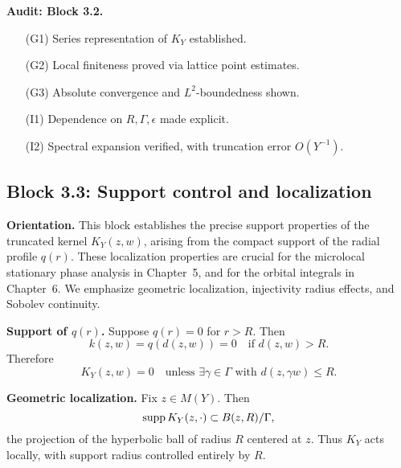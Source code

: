 \medskip

\noindent\textbf{Audit: Block 3.2.}
\begin{itemize}
  \item[(G1)] Series representation of $K_{Y}$ established. 
  \item[(G2)] Local finiteness proved via lattice point estimates. 
  \item[(G3)] Absolute convergence and $L^{2}$-boundedness shown. 
  \item[(I1)] Dependence on $R,\Gamma,\epsilon$ made explicit. 
  \item[(I2)] Spectral expansion verified, with truncation error $O(Y^{-1})$. 
\end{itemize}



\subsection{Block 3.3: Support control and localization}\label{block:3.3}

\noindent
\textbf{Orientation.}
This block establishes the precise support properties of the truncated kernel $K_{Y}(z,w)$,
arising from the compact support of the radial profile $q(r)$.
These localization properties are crucial for the microlocal stationary phase analysis in Chapter~5,
and for the orbital integrals in Chapter~6.
We emphasize geometric localization, injectivity radius effects, and Sobolev continuity.

\medskip

\noindent\textbf{Support of $q(r)$.}
Suppose $q(r)=0$ for $r>R$.
Then
\[
  k(z,w) = q(d(z,w)) = 0 \quad \text{if } d(z,w)>R.
\]
Therefore
\[
  K_{Y}(z,w)=0 \quad \text{unless } \exists \gamma\in\Gamma \text{ with } d(z,\gamma w)\le R.
\]

\medskip

\noindent\textbf{Geometric localization.}
Fix $z\in M(Y)$.
Then
\[
  \operatorname{supp} K_{Y}(z,\cdot) \subset B(z,R)/\Gamma,
\]
the projection of the hyperbolic ball of radius $R$ centered at $z$.
Thus $K_{Y}$ acts locally, with support radius controlled entirely by $R$.

\medskip

